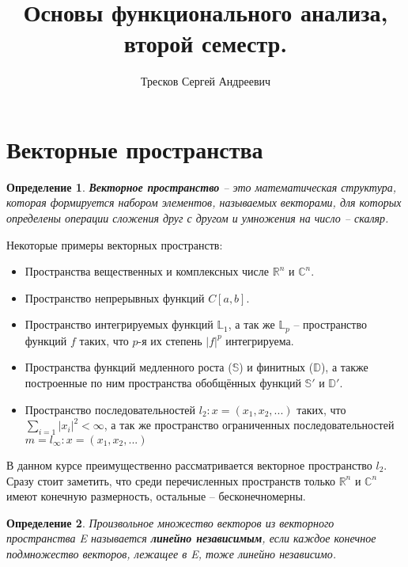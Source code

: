 \documentclass[12pt]{article}
\newtheorem{defi}{Определение}[section]
\begin{document}
	\title{Основы функционального анализа, второй семестр.}
	\author{Тресков Сергей Андреевич}
	\maketitle
	
	\section{Векторные пространства}
	
	\begin{defi} 
		\textbf{Векторное пространство} -- это математическая структура, которая формируется набором элементов, называемых векторами, для 
		которых определены операции сложения друг с другом и умножения на число -- скаляр.
	\end{defi}

	Некоторые примеры векторных пространств:
		\begin{itemize}
			\item Пространства вещественных и комплексных числе $\mathbb{R}^n$ и $\mathbb{C}^n$.
			\item Пространство непрерывных функций $C[a,b]$.
			\item Пространство интегрируемых функций $\mathbb{L}_1$, а так же $\mathbb{L}_p$ -- пространство функций $f$ таких, 
			что $p$-я их степень $|f|^p$ интегрируема.
			\item Пространства функций медленного роста ($\mathbb{S}$) и финитных ($\mathbb{D}$), а также построенные по ним пространства 
			обобщённых функций $\mathbb{S}'$ и $\mathbb{D}'$.
			\item Пространство последовательностей $l_2 : x = (x_1, x_2, ...)$ таких, что $\sum_{i=1} |x_i|^2 < \infty$, а так же 
			пространство ограниченных последовательностей $m = l_\infty : x = (x_1, x_2, ...)$
		\end{itemize}

	В данном курсе преимущественно рассматривается векторное пространство $l_2$. Сразу стоит заметить, что 
	среди перечисленных пространств только $\mathbb{R}^n$ и $\mathbb{C}^n$ имеют конечную размерность, остальные -- бесконечномерны.
	
	\begin{defi}
		Произвольное множество векторов из векторного пространства E называется \textbf{линейно независимым}, если каждое конечное
		подмножество векторов, лежащее в E, тоже линейно независимо.
	\end{defi}
	
\end{document}
